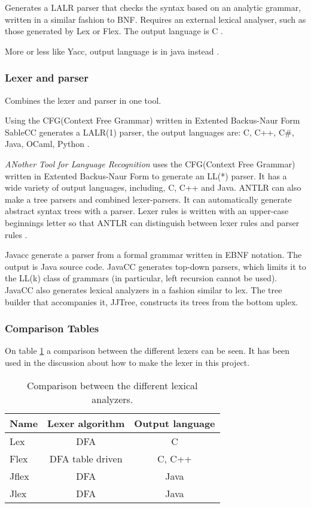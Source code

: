 Generates a LALR parser that checks the syntax based on an analytic grammar, written in a similar fashion to BNF. Requires an external lexical analyser, such as those generated by Lex or Flex. The output language is C \citep{Yacc}.

More or less like Yacc, output language is in java instead \citep{CUP}.

\subsubsection{Lexer and parser}
Combines the lexer and parser in one tool.

Using the CFG(Context Free Grammar) written in Extented Backus-Naur Form SableCC generates a LALR(1) parser, the output languages are: C, C++, C\#, Java, OCaml, Python \citep{SableCC}.

\textit{ANother Tool for Language Recognition} uses the CFG(Context Free Grammar) written in Extented Backus-Naur Form to generate an LL(*) parser. It has a wide variety of output languages, including, C, C++ and Java.
ANTLR can also make a tree parsers and combined lexer-parsers. It can automatically generate abstract syntax trees with a parser\citep{ANTLR}.
Lexer rules is written with an upper-case beginnings letter so that ANTLR can distinguish between lexer rules and parser rules \citep{ANTLRLexer}. 


Javacc generate a parser from a formal grammar written in EBNF notation. The output is Java source code. JavaCC generates top-down parsers, which limits it to the LL(k) class of grammars (in particular, left recursion cannot be used). JavaCC also generates lexical analyzers in a fashion similar to lex\citep{Javacc}. The tree builder that accompanies it, JJTree, constructs its trees from the bottom uplex\citep{JJTree}.

\subsubsection{Comparison Tables}
On table \ref{tab:ComparisonLexer} a comparison between the different lexers can be seen. It has been used in the discussion about how to make the lexer in this project.
\begin{table}[H]
\begin{tabular}{|l|c|c|}
\hline
\textbf{Name}	& \textbf{Lexer algorithm}	& \textbf{Output language}	\\ \hline
Lex				& DFA						& C							\\ \hline
Flex			& DFA table driven			& C, C++					\\ \hline
Jflex			& DFA						& Java						\\ \hline
Jlex			& DFA						& Java						\\ \hline
\end{tabular}
\caption{Comparison between the different lexical analyzers.}
\label{tab:ComparisonLexer}
\end{table}

